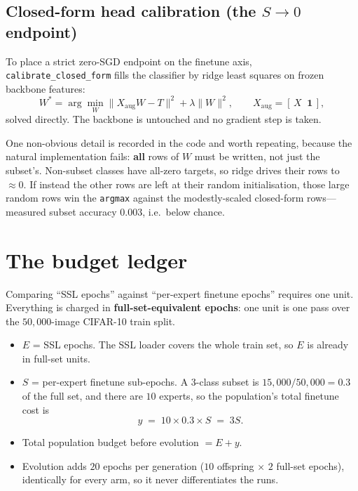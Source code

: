 \documentclass[11pt,a4paper]{article}
\newcommand{\code}[1]{\texttt{\small #1}}
\begin{document}
\subsection{Closed-form head calibration (the $S \to 0$ endpoint)}

To place a strict zero-SGD endpoint on the finetune axis,
\code{calibrate\_closed\_form} fills the classifier by ridge least squares on
frozen backbone features:
\begin{equation}
W^{*} = \arg\min_W \lVert X_{\text{aug}} W - T\rVert^2 + \lambda \lVert W\rVert^2,
\qquad X_{\text{aug}} = [\,X \;\; \mathbf{1}\,],
\end{equation}
solved directly. The backbone is untouched and no gradient step is taken.

One non-obvious detail is recorded in the code and worth repeating, because the
natural implementation fails: \textbf{all} rows of $W$ must be written, not just
the subset's. Non-subset classes have all-zero targets, so ridge drives their
rows to $\approx 0$. If instead the other rows are left at their random
initialisation, those large random rows win the \code{argmax} against the
modestly-scaled closed-form rows---measured subset accuracy $0.003$, i.e.\ below
chance.

\section{The budget ledger}
\label{sec:ledger}

Comparing ``SSL epochs'' against ``per-expert finetune epochs'' requires one
unit. Everything is charged in \textbf{full-set-equivalent epochs}: one unit is
one pass over the $50{,}000$-image CIFAR-10 train split.

\begin{itemize}[leftmargin=*]
\item $E$ = SSL epochs. The SSL loader covers the whole train set, so $E$ is
      already in full-set units.
\item $S$ = per-expert finetune sub-epochs. A 3-class subset is
      $15{,}000/50{,}000 = 0.3$ of the full set, and there are $10$ experts, so
      the population's total finetune cost is
      \begin{equation}
      y \;=\; 10 \times 0.3 \times S \;=\; 3S .
      \end{equation}
\item Total population budget before evolution $= E + y$.
\item Evolution adds $20$ epochs per generation ($10$ offspring $\times$ $2$
      full-set epochs), identically for every arm, so it never differentiates
      the runs.
\end{itemize}
\end{document}
